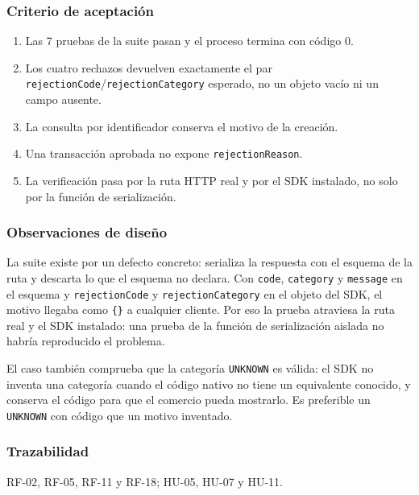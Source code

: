 \subsubsection{Criterio de aceptación}

\begin{enumerate}
  \item Las 7 pruebas de la suite pasan y el proceso termina con código 0.
  \item Los cuatro rechazos devuelven exactamente el par \texttt{rejectionCode}/\texttt{rejectionCategory} esperado, no un objeto vacío ni un campo ausente.
  \item La consulta por identificador conserva el motivo de la creación.
  \item Una transacción aprobada no expone \texttt{rejectionReason}.
  \item La verificación pasa por la ruta HTTP real y por el SDK instalado, no solo por la función de serialización.
\end{enumerate}

\subsubsection{Observaciones de diseño}

La suite existe por un defecto concreto:  serializa la respuesta con el esquema de la ruta y descarta lo que el esquema no declara. Con \texttt{code}, \texttt{category} y \texttt{message} en el esquema y \texttt{rejectionCode} y \texttt{rejectionCategory} en el objeto del SDK, el motivo llegaba como \texttt{\{\}} a cualquier cliente. Por eso la prueba atraviesa la ruta real y el SDK instalado: una prueba de la función de serialización aislada no habría reproducido el problema.

El caso también comprueba que la categoría \texttt{UNKNOWN} es válida: el SDK no inventa una categoría cuando el código nativo no tiene un equivalente conocido, y conserva el código para que el comercio pueda mostrarlo. Es preferible un \texttt{UNKNOWN} con código que un motivo inventado.

\subsubsection{Trazabilidad}

RF-02, RF-05, RF-11 y RF-18; HU-05, HU-07 y HU-11.
